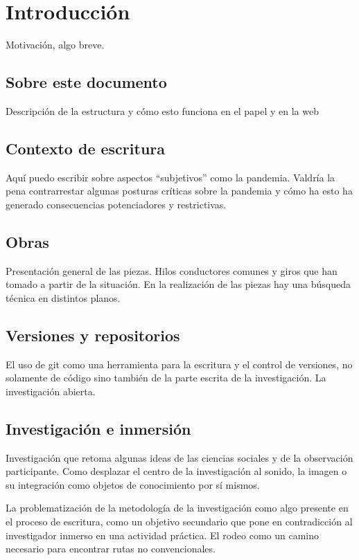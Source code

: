 \chapter{Introducción}

Motivación, algo breve.

\section{Sobre este documento}

Descripción de la estructura y cómo esto funciona en el papel y en la web 

\section{Contexto de escritura}

Aquí puedo escribir sobre aspectos ``subjetivos'' como la pandemia. Valdría la pena contrarrestar algunas posturas críticas sobre la pandemia y cómo ha esto ha generado consecuencias potenciadores y restrictivas. 

\section{Obras}

Presentación general de las piezas. Hilos conductores comunes y giros que han tomado a partir de la situación. En la realización de las piezas hay una búsqueda técnica en distintos planos. 

\section{Versiones y repositorios}

El uso de git como una herramienta para la escritura y el control de versiones, no solamente de código sino también de la parte escrita de la investigación. La investigación abierta. 

\section{Investigación e inmersión}

Investigación que retoma algunas ideas de las ciencias sociales y de la observación participante. Como desplazar el centro de la investigación al sonido, la imagen o su integración como objetos de conocimiento por sí mismos.

La problematización de la metodología de la investigación como algo presente en el proceso de escritura, como un objetivo secundario que pone en contradicción al investigador inmerso en una actividad práctica. El rodeo como un camino necesario para encontrar rutas no convencionales. 

